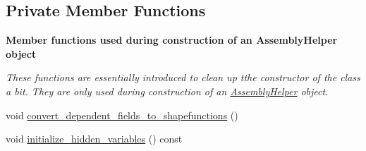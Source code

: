 \subsection*{Private Member Functions}
\begin{Indent}{\bf Member functions used during construction of an Assembly\+Helper object}\par
{\em These functions are essentially introduced to clean up tthe constructor of the class a bit. They are only used during construction of an \hyperlink{class_assembly_helper}{Assembly\+Helper} object. }\begin{DoxyCompactItemize}
\item 
void \hyperlink{class_assembly_helper_aad21ced11a2d90c804827854c18f7f89}{convert\+\_\+dependent\+\_\+fields\+\_\+to\+\_\+shapefunctions} ()
\item 
void \hyperlink{class_assembly_helper_a1cd5d35b136347876aa13b89749338a0}{initialize\+\_\+hidden\+\_\+variables} () const 
\end{DoxyCompactItemize}
\end{Indent}
